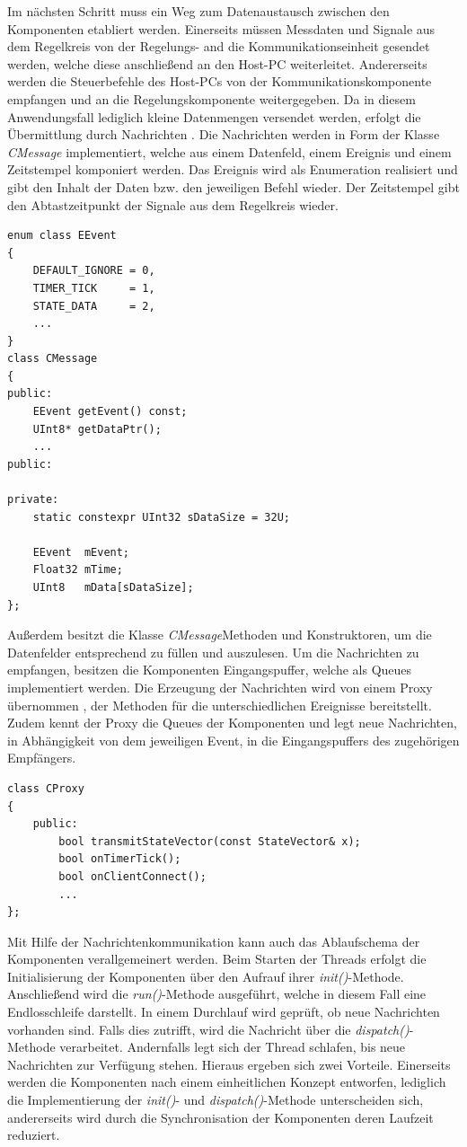 Im nächsten Schritt muss ein Weg zum Datenaustausch zwischen den Komponenten etabliert werden. Einerseits müssen Messdaten und Signale aus dem Regelkreis von der Regelungs- and die Kommunikationseinheit gesendet werden, welche diese anschließend an den Host-PC weiterleitet. Andererseits werden die Steuerbefehle des Host-PCs von der Kommunikationskomponente empfangen und an die Regelungskomponente weitergegeben. Da in diesem Anwendungsfall lediglich kleine Datenmengen versendet werden, erfolgt die Übermittlung durch Nachrichten \cite[S. 196]{Wietzke1}. Die Nachrichten werden in Form der Klasse \textit{CMessage} implementiert, welche aus einem Datenfeld, einem Ereignis und einem Zeitstempel komponiert werden. Das Ereignis wird als Enumeration realisiert und gibt den Inhalt der Daten bzw. den jeweiligen Befehl wieder. Der Zeitstempel gibt den Abtastzeitpunkt der Signale aus dem Regelkreis wieder. 
\begin{lstlisting}[caption={Beispielhafte Implementierung der Events und Nachrichten},captionpos=b]
enum class EEvent
{
	DEFAULT_IGNORE = 0,
	TIMER_TICK     = 1,
	STATE_DATA     = 2,
	...
}
class CMessage
{
public:
	EEvent getEvent() const;
	UInt8* getDataPtr();
	...
public:

private:
	static constexpr UInt32 sDataSize = 32U;

	EEvent  mEvent;
	Float32 mTime;	
	UInt8   mData[sDataSize];
};
\end{lstlisting}
Außerdem besitzt die Klasse \textit{CMessage}Methoden und Konstruktoren, um die Datenfelder entsprechend zu füllen und auszulesen. Um die Nachrichten zu empfangen, besitzen die Komponenten Eingangspuffer, welche als Queues implementiert werden. Die Erzeugung der Nachrichten wird von einem Proxy übernommen \cite[S. 285 ff.]{Wietzke1}, der Methoden für die unterschiedlichen Ereignisse bereitstellt. Zudem kennt der Proxy die Queues der Komponenten und legt neue Nachrichten, in Abhängigkeit von dem jeweiligen Event, in die Eingangspuffers des zugehörigen Empfängers.
\begin{lstlisting}[caption={Aufbau der Proxy-Klasse},captionpos=b]
class CProxy
{
	public:
		bool transmitStateVector(const StateVector& x);
		bool onTimerTick();
		bool onClientConnect();
		...
};
\end{lstlisting}
Mit Hilfe der Nachrichtenkommunikation kann auch das Ablaufschema der Komponenten verallgemeinert werden. Beim Starten der Threads erfolgt die Initialisierung der Komponenten über den Aufrauf ihrer \textit{init()}-Methode. Anschließend wird die \textit{run()}-Methode ausgeführt, welche in diesem Fall eine Endlosschleife darstellt. In einem Durchlauf wird geprüft, ob neue Nachrichten vorhanden sind. Falls dies zutrifft, wird die Nachricht über die \textit{dispatch()}-Methode verarbeitet. Andernfalls legt sich der Thread schlafen, bis neue Nachrichten zur Verfügung stehen. Hieraus ergeben sich zwei Vorteile. Einerseits werden die Komponenten nach einem einheitlichen Konzept entworfen, lediglich die Implementierung der \textit{init()}- und \textit{dispatch()}-Methode unterscheiden sich, andererseits wird durch die Synchronisation der Komponenten deren Laufzeit reduziert.